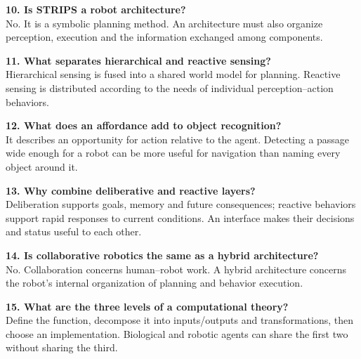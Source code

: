 \begin{samepage}\textbf{10. Is STRIPS a robot architecture?}\\
No. It is a symbolic planning method. An architecture must also organize perception, execution and the information exchanged among components.\par\end{samepage}

\begin{samepage}\textbf{11. What separates hierarchical and reactive sensing?}\\
Hierarchical sensing is fused into a shared world model for planning. Reactive sensing is distributed according to the needs of individual perception--action behaviors.\par\end{samepage}

\begin{samepage}\textbf{12. What does an affordance add to object recognition?}\\
It describes an opportunity for action relative to the agent. Detecting a passage wide enough for a robot can be more useful for navigation than naming every object around it.\par\end{samepage}

\begin{samepage}\textbf{13. Why combine deliberative and reactive layers?}\\
Deliberation supports goals, memory and future consequences; reactive behaviors support rapid responses to current conditions. An interface makes their decisions and status useful to each other.\par\end{samepage}

\begin{samepage}\textbf{14. Is collaborative robotics the same as a hybrid architecture?}\\
No. Collaboration concerns human--robot work. A hybrid architecture concerns the robot's internal organization of planning and behavior execution.\par\end{samepage}

\begin{samepage}\textbf{15. What are the three levels of a computational theory?}\\
Define the function, decompose it into inputs/outputs and transformations, then choose an implementation. Biological and robotic agents can share the first two without sharing the third.\par\end{samepage}

